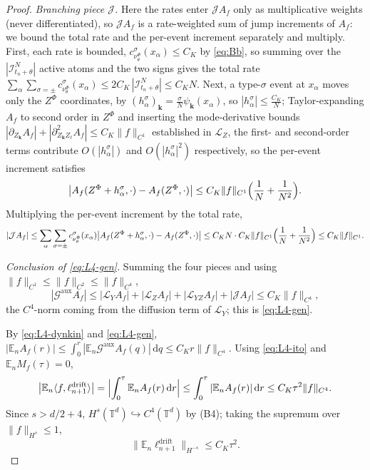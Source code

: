 \documentclass[a4paper,fleqn]{cas-sc}
\theoremstyle{definition}
\theoremstyle{remark}
\begin{document}
\begin{proof}
\emph{Branching piece $\mathcal J$.}
Here the rates enter $\mathcal JA_f$ only as multiplicative weights (never differentiated), so
$\mathcal JA_f$ is a rate-weighted sum of jump increments of $A_f$: we bound the total rate and the
per-event increment separately and multiply. First, each rate is bounded,
$c^\sigma_{\nu^\Phi_\theta}(x_\alpha)\le C_K$ by \eqref{eq:Bb}, so summing over the
$|\mathcal I^N_{t_n+\theta}|$ active atoms and the two signs gives the total rate
$\sum_\alpha\sum_{\sigma=\pm}c^\sigma_{\nu^\Phi_\theta}(x_\alpha)\le2C_K\,|\mathcal I^N_{t_n+\theta}|\le C_KN$.
Next, a type-$\sigma$ event at $x_\alpha$ moves only the $Z^\Phi$ coordinates, by
$(h^\sigma_\alpha)_{\mathbf k}=\tfrac{\sigma}N\psi_{\mathbf k}(x_\alpha)$, so $|h^\sigma_\alpha|\le\tfrac{C_K}N$;
Taylor-expanding $A_f$ to second order in $Z^\Phi$ and inserting the mode-derivative bounds
$|\partial_{Z_{\mathbf k}}A_f|+|\partial^2_{Z_{\mathbf k}Z_\ell}A_f|\le C_K\|f\|_{C^1}$ established in
$\mathcal L_Z$, the first- and second-order terms contribute $O(|h^\sigma_\alpha|)$ and
$O(|h^\sigma_\alpha|^2)$ respectively, so the per-event increment satisfies
\[
\bigl|A_f(Z^\Phi+h^\sigma_\alpha,\cdot)-A_f(Z^\Phi,\cdot)\bigr|\le C_K\|f\|_{C^1}\Bigl(\frac1N+\frac1{N^2}\Bigr).
\]
Multiplying the per-event increment by the total rate,
\[
|\mathcal JA_f|
\le\sum_{\alpha}\sum_{\sigma=\pm}c^\sigma_{\nu^\Phi_\theta}(x_\alpha)
\bigl|A_f(Z^\Phi+h^\sigma_\alpha,\cdot)-A_f(Z^\Phi,\cdot)\bigr|
\le C_KN\cdot C_K\|f\|_{C^1}\Bigl(\frac1N+\frac1{N^2}\Bigr)\le C_K\|f\|_{C^1}.
\]

\emph{Conclusion of \eqref{eq:L4-gen}.}
Summing the four pieces and using $\|f\|_{C^1}\le\|f\|_{C^2}\le\|f\|_{C^4}$,
\[
|\mathcal G^{\mathrm{aux}}A_f|
\le|\mathcal L_YA_f|+|\mathcal L_ZA_f|+|\mathcal L_{YZ}A_f|+|\mathcal JA_f|
\le C_K\|f\|_{C^4},
\]
the $C^4$-norm coming from the diffusion term of $\mathcal L_Y$; this is \eqref{eq:L4-gen}.

By \eqref{eq:L4-dynkin} and \eqref{eq:L4-gen},
$|\mathbb E_nA_f(r)|\le\int_0^r|\mathbb E_n\mathcal G^{\mathrm{aux}}A_f(q)|\,\mathrm dq\le C_Kr\|f\|_{C^4}$.
Using \eqref{eq:L4-ito} and $\mathbb E_nM_f(\tau)=0$,
\[
\bigl|\mathbb E_n\langle f,\ell^{\mathrm{drift}}_{n+1}\rangle\bigr|
=\Bigl|\int_0^\tau\mathbb E_nA_f(r)\,\mathrm dr\Bigr|
\le\int_0^\tau|\mathbb E_nA_f(r)|\,\mathrm dr\le C_K\tau^2\|f\|_{C^4}.
\]
Since $s>d/2+4$, $H^s(\mathbb T^d)\hookrightarrow C^4(\mathbb T^d)$ by (B4); taking the
supremum over $\|f\|_{H^s}\le1$,
\[
\|\mathbb E_n\ell^{\mathrm{drift}}_{n+1}\|_{H^{-s}}\le C_K\tau^2.
\]


\end{proof}
\end{document}
